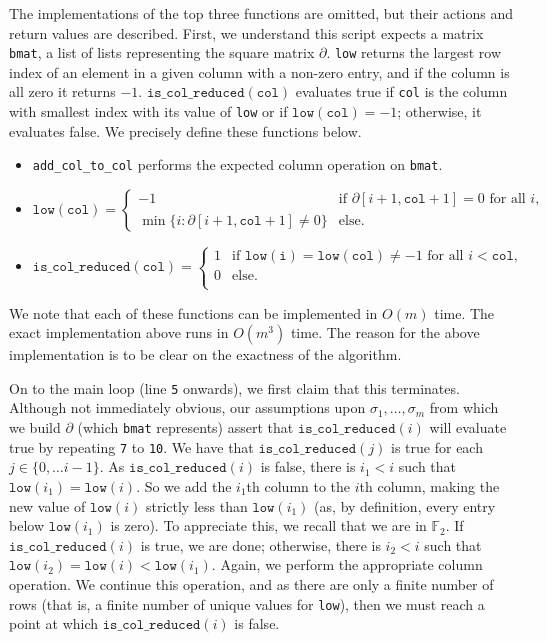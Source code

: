 The implementations of the top three functions are omitted, but their actions and return values are described. First, we understand this script expects a matrix \texttt{bmat}, a list of lists representing the square matrix $\partial$. \texttt{low} returns the largest row index of an element in a given column with a non-zero entry, and if the column is all zero it returns $-1$. $\mathtt{is\_col\_reduced}(\mathtt{col})$ evaluates true if \texttt{col} is the column with smallest index with its value of \texttt{low} or if $\mathtt{low}(\mathtt{col}) = -1$; otherwise, it evaluates false. We precisely define these functions below. 
\begin{itemize}
  \small
  \item \texttt{add\_col\_to\_col} performs the expected column operation on \texttt{bmat}.
  \item $\mathtt{low}(\mathtt{col}) = \begin{cases}
    -1 & \text{if $\partial[i+1, \mathtt{col}+1] = 0$ for all $i$}, \\
    \min\{i : \partial[i+1, \mathtt{col}+1] \neq 0\} & \text{else}.
  \end{cases}$
  \item $\mathtt{is\_col\_reduced}(\mathtt{col}) = \begin{cases}
    1 & \text{if $\mathtt{low}(\mathtt{i}) = \mathtt{low}(\mathtt{col}) \neq -1$ for all $i < \mathtt{col}$}, \\
    0 & \text{else}. \\
  \end{cases}$ 
\end{itemize}
We note that each of these functions can be implemented in $O(m)$ time. The exact implementation above runs in $O(m^3)$ time. The reason for the above implementation is to be clear on the exactness of the algorithm. 

On to the main loop (line \texttt{5} onwards), we first claim that this terminates. Although not immediately obvious, our assumptions upon $\sigma_1, \ldots, \sigma_m$ from which we build $\partial$ (which \texttt{bmat} represents) assert that  $\mathtt{is\_col\_reduced}(i)$ will evaluate true by repeating \texttt{7} to \texttt{10}. We have that $\mathtt{is\_col\_reduced}(j)$ is true for each $j \in \{0, \ldots i-1\}$. As $\mathtt{is\_col\_reduced}(i)$ is false, there is $i_1 < i$ such that $\mathtt{low}(i_1) = \mathtt{low}(i)$. So we add the $i_1$th column to the $i$th column, making the new value of $\mathtt{low}(i)$ strictly less than $\mathtt{low}(i_1)$ (as, by definition, every entry below $\mathtt{low}(i_1)$ is zero). To appreciate this, we recall that we are in $\mathbb F_2$. If $\mathtt{is\_col\_reduced}(i)$ is true, we are done; otherwise, there is $i_2 < i$ such that $\mathtt{low}(i_2) = \mathtt{low}(i) < \mathtt{low}(i_1)$. Again, we perform the appropriate column operation. We continue this operation, and as there are only a finite number of rows (that is, a finite number of unique values for \texttt{low}), then we must reach a point at which $\mathtt{is\_col\_reduced}(i)$ is false. 

